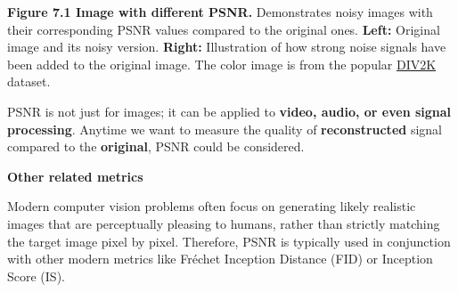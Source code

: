 \textbf{Figure 7.1 Image with different PSNR.} Demonstrates noisy images with their corresponding PSNR values compared to the original ones. \textbf{Left:} Original image and its noisy version. 
\textbf{Right:} Illustration of how strong noise signals have been added to the original image.
The color image is from the popular \href{https://data.vision.ee.ethz.ch/cvl/DIV2K/}{DIV2K} dataset.
\vspace{-12pt} 

{PSNR is not just for images; it can be applied to \textbf{video, audio, or even signal processing}. Anytime we want to measure the quality of \textbf{reconstructed} signal compared to the \textbf{original}, PSNR could be considered.}

\vspace{-5pt} 

\textbf{Other related metrics}

\vspace{-5pt} 

Modern computer vision problems often focus on generating likely realistic images that are perceptually pleasing to humans, rather than strictly matching the
target image pixel by pixel. Therefore, PSNR is typically used in conjunction with other modern metrics like Fréchet Inception Distance (FID) or Inception Score (IS).


